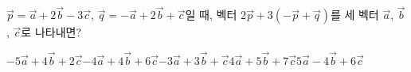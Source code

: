 $\vec{p}=\vec{a}+2\vec{b}-3\vec{c}$, $\vec{q}=-\vec{a}+2\vec{b}+\vec{c}$일 때, 벡터 $2\vec{p}+3(-\vec{p}+\vec{q})$를 세 벡터 $\vec{a}$, $\vec{b}$, $\vec{c}$로 나타내면?
\begin{choicesii}{$-5\vec{a}+4\vec{b}+2\vec{c}$}{$-4\vec{a}+4\vec{b}+6\vec{c}$}{$-3\vec{a}+3\vec{b}+\vec{c}$}{$4\vec{a}+5\vec{b}+7\vec{c}$}{$5\vec{a}-4\vec{b}+6\vec{c}$}\end{choicesii}
